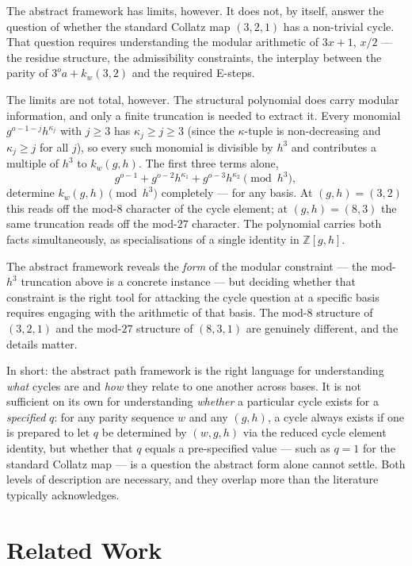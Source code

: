 \documentclass[12pt]{article}
\theoremstyle{definition}
\theoremstyle{remark}
\newcommand{\ZZ}{\mathbb{Z}}
\newcommand{\kpoly}{k}
\begin{document}
The abstract framework has limits, however.  It does not, by itself, answer
the question of whether the standard Collatz map $(3,2,1)$ has a non-trivial
cycle.  That question requires understanding the modular arithmetic of
$3x+1$, $x/2$ — the residue structure, the admissibility constraints, the
interplay between the parity of $3^o a + \kpoly_w(3,2)$ and the required
E-steps.

The limits are not total, however.  The structural polynomial does carry
modular information, and only a finite truncation is needed to extract it.
Every monomial $g^{o-1-j} h^{\kappa_j}$ with $j \geq 3$ has $\kappa_j \geq j \geq 3$
(since the $\kappa$-tuple is non-decreasing and $\kappa_j \geq j$ for all $j$),
so every such monomial is divisible by $h^3$ and contributes a multiple of
$h^3$ to $\kpoly_w(g,h)$.  The
first three terms alone,
\[
  g^{o-1} + g^{o-2} h^{\kappa_1} + g^{o-3} h^{\kappa_2} \pmod{h^3},
\]
determine $\kpoly_w(g,h) \pmod{h^3}$ completely — for any basis.  At
$(g,h) = (3,2)$ this reads off the mod-$8$ character of the cycle element;
at $(g,h) = (8,3)$ the same truncation reads off the mod-$27$ character.
The polynomial carries both facts simultaneously, as specialisations of a
single identity in $\ZZ[g,h]$.

The abstract framework reveals the \emph{form} of the modular constraint —
the mod-$h^3$ truncation above is a concrete instance — but deciding whether
that constraint is the right tool for attacking the cycle question at a
specific basis requires engaging with the arithmetic of that basis.  The
mod-$8$ structure of $(3,2,1)$ and the mod-$27$ structure of $(8,3,1)$ are
genuinely different, and the details matter.

In short: the abstract path framework is the right language for
understanding \emph{what} cycles are and \emph{how} they relate to one
another across bases.  It is not sufficient on its own for understanding
\emph{whether} a particular cycle exists for a \emph{specified} $q$: for
any parity sequence $w$ and any $(g,h)$, a cycle always exists if one is
prepared to let $q$ be determined by $(w,g,h)$ via the reduced cycle
element identity, but whether that $q$ equals a pre-specified value —
such as $q = 1$ for the standard Collatz map — is a question the abstract
form alone cannot settle.  Both levels of description are necessary, and
they overlap more than the literature typically acknowledges.

\section{Related Work}
\label{sec:related}
\end{document}
